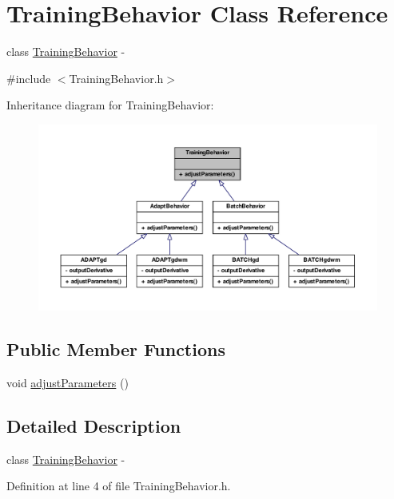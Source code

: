 \hypertarget{class_training_behavior}{
\section{TrainingBehavior Class Reference}
\label{class_training_behavior}
}


class \hyperlink{class_training_behavior}{TrainingBehavior} -\/  




{\ttfamily \#include $<$TrainingBehavior.h$>$}



Inheritance diagram for TrainingBehavior:
\nopagebreak
\begin{figure}[H]
\begin{center}
\leavevmode
\includegraphics[width=400pt]{class_training_behavior__inherit__graph}
\end{center}
\end{figure}
\subsection*{Public Member Functions}
\begin{DoxyCompactItemize}
\item 
void \hyperlink{class_training_behavior_ae5729ae35b8557f92872ce778e4d8657}{adjustParameters} ()
\end{DoxyCompactItemize}


\subsection{Detailed Description}
class \hyperlink{class_training_behavior}{TrainingBehavior} -\/ 

Definition at line 4 of file TrainingBehavior.h.



